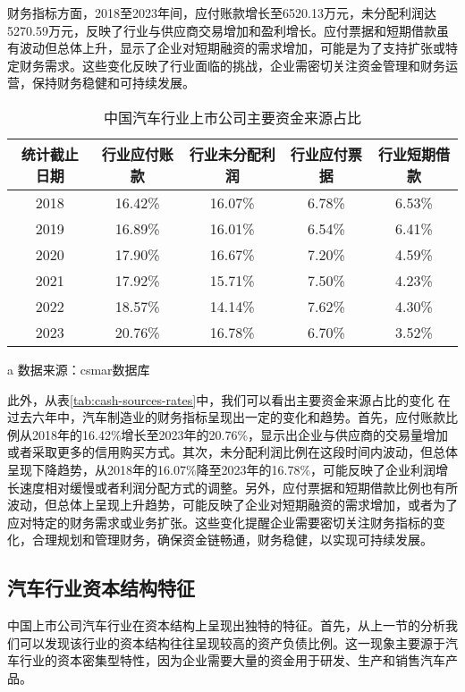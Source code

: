 财务指标方面，2018至2023年间，应付账款增长至6520.13万元，未分配利润达5270.59万元，反映了行业与供应商交易增加和盈利增长。应付票据和短期借款虽有波动但总体上升，显示了企业对短期融资的需求增加，可能是为了支持扩张或特定财务需求。这些变化反映了行业面临的挑战，企业需密切关注资金管理和财务运营，保持财务稳健和可持续发展。

\begin{table}
  \centering
  \begin{threeparttable}[c]
    \caption{中国汽车行业上市公司主要资金来源占比}
    \label{tab:cash-sources-rates}
    \begin{tabular}{ccccc}
      \toprule
         统计截止日期 & 行业应付账款 & 行业未分配利润 & 行业应付票据 & 行业短期借款 \\ 
      \midrule
        2018 & 16.42\% & 16.07\% & 6.78\% & 6.53\% \\ 
        2019 & 16.89\% & 16.01\% & 6.54\% & 6.41\% \\ 
        2020 & 17.90\% & 16.67\% & 7.20\% & 4.59\% \\
        2021 & 17.92\% & 15.71\% & 7.50\% & 4.23\% \\ 
        2022 & 18.57\% & 14.14\% & 7.62\% & 4.30\% \\ 
        2023 & 20.76\% & 16.78\% & 6.70\% & 3.52\% \\ 
      \bottomrule
    \end{tabular}
    \begin{tablenotes}
      \item [a] 数据来源：csmar数据库
    \end{tablenotes}
  \end{threeparttable}
\end{table}
此外，从表\eqref{tab:cash-sources-rates}中，我们可以看出主要资金来源占比的变化 在过去六年中，汽车制造业的财务指标呈现出一定的变化和趋势。首先，应付账款比例从2018年的16.42\%增长至2023年的20.76\%，显示出企业与供应商的交易量增加或者采取更多的信用购买方式。其次，未分配利润比例在这段时间内波动，但总体呈现下降趋势，从2018年的16.07\%降至2023年的16.78\%，可能反映了企业利润增长速度相对缓慢或者利润分配方式的调整。另外，应付票据和短期借款比例也有所波动，但总体上呈现上升趋势，可能反映了企业对短期融资的需求增加，或者为了应对特定的财务需求或业务扩张。这些变化提醒企业需要密切关注财务指标的变化，合理规划和管理财务，确保资金链畅通，财务稳健，以实现可持续发展。

\subsection{汽车行业资本结构特征}
中国上市公司汽车行业在资本结构上呈现出独特的特征。首先，从上一节的分析我们可以发现该行业的资本结构往往呈现较高的资产负债比例。这一现象主要源于汽车行业的资本密集型特性，因为企业需要大量的资金用于研发、生产和销售汽车产品。

